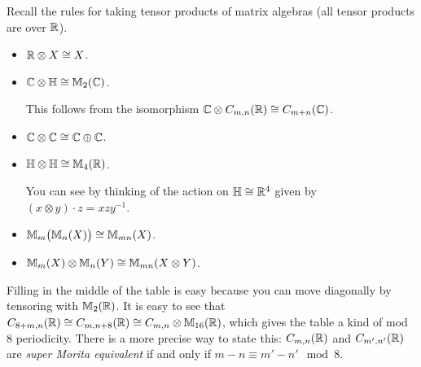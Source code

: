  Recall the rules for taking tensor products of matrix algebras (all tensor products are
 over $\mathbb{R}$).
 \begin{itemize}
   \item $\mathbb{R}\otimes X \cong X$.

   \item $\mathbb{C}\otimes \mathbb{H} \cong \mathbb{M}_2(\mathbb{C})$.

   This follows from the isomorphism $\mathbb{C}\otimes C_{m,n}(\mathbb{R})\cong C_{m+n}(\mathbb{C})$.

   \item $\mathbb{C}\otimes \mathbb{C}\cong \mathbb{C}\oplus \mathbb{C}$.

   \item $\mathbb{H}\otimes \mathbb{H} \cong \mathbb{M}_4(\mathbb{R})$.

   You can see by thinking of the action on
   $\mathbb{H}\cong \mathbb{R}^4$ given by $(x\otimes y)\cdot z = xzy^{-1}$.

   \item $\mathbb{M}_m\bigl(\mathbb{M}_n(X)\bigr) \cong \mathbb{M}_{mn}(X)$.
   \item $\mathbb{M}_m(X)\otimes \mathbb{M}_n(Y) \cong \mathbb{M}_{mn}(X\otimes Y)$.
 \end{itemize}

 Filling in the middle of the table is easy because you can move diagonally by tensoring
 with $\mathbb{M}_2(\mathbb{R})$. It is easy to see that $C_{8+m,n}(\mathbb{R})\cong C_{m,n+8}(\mathbb{R}) \cong
 C_{m,n}\otimes \mathbb{M}_{16}(\mathbb{R})$, which gives the table a kind of mod 8 periodicity. There
 is a more precise way to state this: $C_{m,n}(\mathbb{R})$ and $C_{m',n'}(\mathbb{R})$ are \emph{super
 Morita equivalent} if and only if $m-n\equiv m'-n'\mod
 8$.

